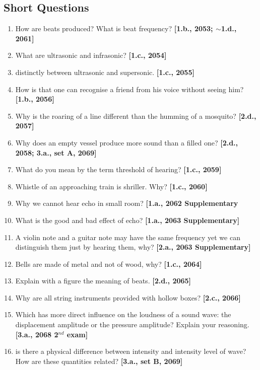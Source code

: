 \documentclass[a4paper,10pt]{report}
\begin{document}
 \subsection{Short Questions}
  \begin{enumerate}
   \item How are beats produced? What is beat frequency? \textbf{[1.b., 2053; $\sim$1.d., 2061]}
   \item What are ultrasonic and infrasonic? \textbf{[1.c., 2054]}
   \item distinctly between ultrasonic and supersonic. \textbf{[1.c., 2055]}
   \item How is that one can recognise a friend from his voice without seeing him? \textbf{[1.b., 2056]}
   \item Why is the roaring of a line different than the humming of a mosquito? \textbf{[2.d., 2057]}
   \item Why does an empty vessel produce more sound than a filled one? \textbf{[2.d., 2058; 3.a., set A, 2069]}
   \item What do you mean by the term threshold of hearing? \textbf{[1.c., 2059]}
   \item Whistle of an approaching train is shriller. Why? \textbf{[1.c., 2060]}
   \item Why we cannot hear echo in small room? \textbf{[1.a., 2062 Supplementary}
   \item What is the good and bad effect of echo? \textbf{[1.a., 2063 Supplementary]}
   \item A violin note and a guitar note may have the same frequency yet we can distinguish them just by hearing them, why?
    \textbf{[2.a., 2063 Supplementary]}
   \item Bells are made of metal and not of wood, why? \textbf{[1.c., 2064]}
   \item Explain with a figure the meaning of beats. \textbf{[2.d., 2065]}
   \item Why are all string instruments provided with hollow boxes? \textbf{[2.c., 2066]}
   \item Which has more direct influence on the loudness of a sound wave: the displacement amplitude or the pressure amplitude?
    Explain your reasoning. \textbf{[3.a., 2068 2$^{nd}$ exam]}
   \item is there a physical difference between intensity and intensity level of wave? How are these quantities related?
    \textbf{[3.a., set B, 2069]}
  \end{enumerate}
  
\end{document}
